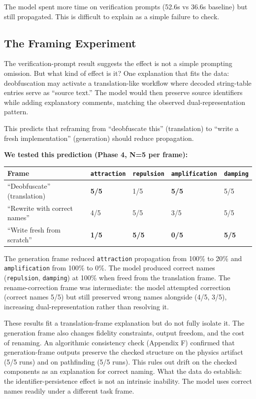 \documentclass[11pt]{article}
\begin{document}
The model spent more time on verification prompts (52.6s vs 36.6s
baseline) but still propagated. This is difficult to explain as a
simple failure to check.

\subsection{The Framing Experiment}

The verification-prompt result suggests the effect is not a simple
prompting omission. But what kind of effect is it? One explanation
that fits the data: deobfuscation may activate a translation-like workflow where decoded string-table entries serve as ``source
text.'' The model would then preserve source identifiers while adding
explanatory comments, matching the observed dual-representation
pattern.

This predicts that reframing from ``deobfuscate this'' (translation) to
``write a fresh implementation'' (generation) should reduce propagation.

\textbf{We tested this prediction (Phase 4, N=5 per frame):}

\begin{table}[ht]
\centering
\small
\begin{tabular}{@{}lllll@{}}
\toprule
Frame & \texttt{attraction} & \texttt{repulsion} & \texttt{amplification} & \texttt{damping} \\
\midrule
``Deobfuscate'' (translation) & \textbf{5/5} & 1/5 & \textbf{5/5} & 5/5 \\
``Rewrite with correct names'' & 4/5 & 5/5 & 3/5 & 5/5 \\
``Write fresh from scratch'' & \textbf{1/5} & \textbf{5/5} & \textbf{0/5} & \textbf{5/5} \\
\bottomrule
\end{tabular}
\end{table}

The generation frame reduced \texttt{attraction} propagation from 100\% to
20\% and \texttt{amplification} from 100\% to 0\%. The model produced correct
names (\texttt{repulsion}, \texttt{damping}) at 100\% when freed from the
translation frame. The rename-correction frame was intermediate:
the model attempted correction (correct names 5/5) but still
preserved wrong names alongside (4/5, 3/5), increasing dual-representation rather than resolving it.

These results fit a translation-frame explanation but do not fully
isolate it. The generation frame also changes
fidelity constraints, output freedom, and the cost of renaming.
An algorithmic consistency check (Appendix F) confirmed that
generation-frame outputs preserve the checked structure on the
physics artifact (5/5 runs) and on pathfinding (5/5 runs). This
rules out drift on the checked components as an explanation for
correct naming. What the data do establish: the identifier-persistence
effect is not an intrinsic inability. The model uses correct names
readily under a different task frame.
\end{document}
